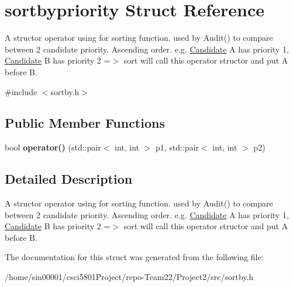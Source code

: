 \hypertarget{structsortbypriority}{}\section{sortbypriority Struct Reference}
\label{structsortbypriority}


A structor operator using for sorting function. used by Audit() to compare between 2 candidate priority. Ascending order. e.\+g. \hyperlink{classCandidate}{Candidate} A has priority 1, \hyperlink{classCandidate}{Candidate} B has priority 2 =$>$ sort will call this operator structor and put A before B.  




{\ttfamily \#include $<$sortby.\+h$>$}

\subsection*{Public Member Functions}
\begin{DoxyCompactItemize}
\item 
\mbox{\label{structsortbypriority_aa3918f98be8c669b120712a9bb961494}} 
bool {\bfseries operator()} (std\+::pair$<$ int, int $>$ p1, std\+::pair$<$ int, int $>$ p2)
\end{DoxyCompactItemize}


\subsection{Detailed Description}
A structor operator using for sorting function. used by Audit() to compare between 2 candidate priority. Ascending order. e.\+g. \hyperlink{classCandidate}{Candidate} A has priority 1, \hyperlink{classCandidate}{Candidate} B has priority 2 =$>$ sort will call this operator structor and put A before B. 

The documentation for this struct was generated from the following file\+:\begin{DoxyCompactItemize}
\item 
/home/sin00001/csci5801\+Project/repo-\/\+Team22/\+Project2/src/sortby.\+h\end{DoxyCompactItemize}
